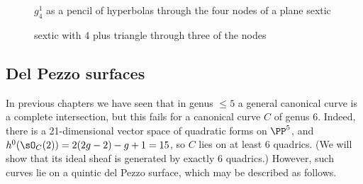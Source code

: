 \begin{figure}
\begin{center}
\caption{$g^1_4$ as a pencil of hyperbolas through the four nodes of a plane sextic}
\label{default}
\end{center}
\end{figure}
 
 
\begin{figure}
\begin{center}
\caption{sextic with 4 plus triangle through three of the nodes}
\label{default}
\end{center}
\end{figure}


\subsection{Del Pezzo surfaces}

In previous chapters we have seen that in genus $\leq 5$ a general canonical curve is  a complete intersection, but this fails for a canonical curve $C$ of genus 6. Indeed, there is a 21-dimensional vector space of
quadratic forms on $\PP^5$, and $h^0(\sO_C(2)) = 2(2g-2)-g+1 = 15$, so $C$ lies on at least 6 quadrics. (We will show that its ideal sheaf is generated by exactly 6 quadrics.) However, such curves lie on a quintic del Pezzo surface, which may be described as follows.

